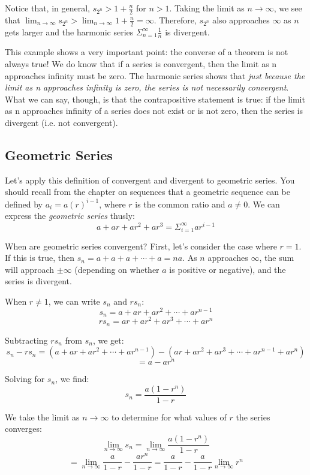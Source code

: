 Notice that, in general, $s_{2^n} > 1 + \frac{n}{2}$ for $n > 1$. Taking the 
limit as $n \to \infty$, we see that $\lim_{n \to \infty} s_{2^n} > \lim_{n 
\to \infty} 1 + \frac{n}{2} = \infty$. Therefore, $s_{2^n}$ also approaches 
$\infty$ as $n$ gets larger and the harmonic series $\Sigma_{n = 1}^\infty 
\frac{1}{n}$ is divergent. 

This example shows a very important point: the converse of a theorem is not 
always true! We do know that if a series is convergent, then the limit as n 
approaches infinity must be zero. The harmonic series shows that \textit{just 
because the limit as n approaches infinity is zero, the series is not 
necessarily convergent}. What we can say, though, is that the contrapositive 
statement is true: if the limit as n approaches infinity of a series does not 
exist or is not zero, then the series is divergent (i.e. not convergent). 

\subsection{Geometric Series}

Let's apply this definition of convergent and divergent to geometric 
series. You should recall from the chapter on sequences that a 
geometric sequence can be defined by $a_i = a(r)^{i-1}$, where $r$ 
is the common ratio and $a \neq 0$. We can express the 
\textit{geometric series} thusly:
$$a + ar + ar^2 + ar^3 = \Sigma_{i=1}^\infty ar^{i-1}$$

When are geometric series convergent? First, let's consider the case 
where $r=1$. If this is true, then $s_n = a + a + a + \cdots + a = 
na$. As $n$ approaches $\infty$, the sum will approach $\pm \infty$ 
(depending on whether $a$ is positive or negative), and the series is 
divergent. 

When $r \neq 1$, we can write $s_n$ and $rs_n$:
$$s_n = a + ar + ar^2 + \cdots + ar^{n-1}$$
$$rs_n = ar + ar^2 + ar^3 + \cdots + ar^n$$

Subtracting $rs_n$ from $s_n$, we get:
$$s_n - rs_n = (a + ar + ar^2 + \cdots + ar^{n-1}) - (ar + ar^2 + 
ar^3 + \cdots + ar^{n-1} + ar^n)$$
$$= a - ar^n$$

Solving for $s_n$, we find:
$$s_n = \frac{a(1-r^n)}{1-r}$$

We take the limit as $n \to \infty$ to determine for what values of 
$r$ the series converges:
$$\lim_{n \to \infty} s_n = \lim_{n \to \infty} \frac{a(1-r^n)}{1-r}$$
$$= \lim_{n\to \infty} \frac{a}{1-r} - \frac{ar^n}{1-r} = \frac{a}{1-r} 
- \frac{a}{1-r}\lim_{n \to \infty} r^n$$

